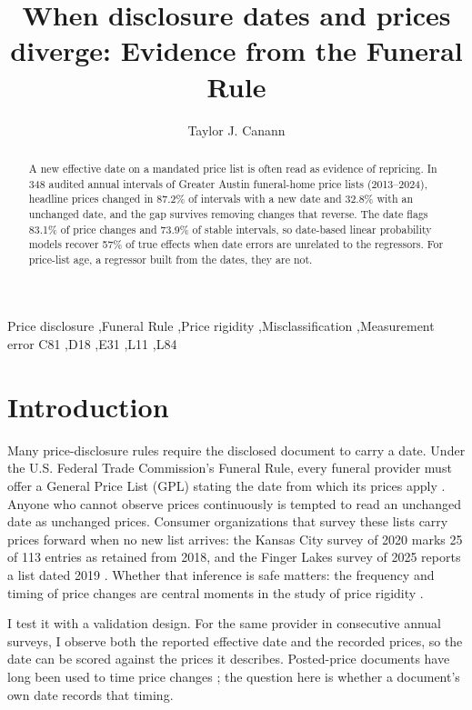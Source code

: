 \documentclass[preprint,12pt,authoryear]{elsarticle}
\makeatletter
\newcommand{\authoremail}{tcanann@latech.edu}
\makeatother
\begin{document}
\begin{frontmatter}
\title{When disclosure dates and prices diverge: Evidence from the Funeral Rule}
\author{Taylor J. Canann}
\ead{\authoremail}

\begin{abstract}
A new effective date on a mandated price list is often read as evidence of repricing. In 348 audited annual intervals of Greater Austin funeral-home price lists (2013--2024), headline prices changed in 87.2\% of intervals with a new date and 32.8\% with an unchanged date, and the gap survives removing changes that reverse. The date flags 83.1\% of price changes and 73.9\% of stable intervals, so date-based linear probability models recover 57\% of true effects when date errors are unrelated to the regressors. For price-list age, a regressor built from the dates, they are not.
\end{abstract}

\begin{keyword}
Price disclosure \sep Funeral Rule \sep Price rigidity \sep Misclassification \sep Measurement error
\JEL C81 \sep D18 \sep E31 \sep L11 \sep L84
\end{keyword}
\end{frontmatter}

\section{Introduction}
Many price-disclosure rules require the disclosed document to carry a date. Under the U.S. Federal Trade Commission's Funeral Rule, every funeral provider must offer a General Price List (GPL) stating the date from which its prices apply \citep{ftc_funeral_rule_guide}. Anyone who cannot observe prices continuously is tempted to read an unchanged date as unchanged prices. Consumer organizations that survey these lists carry prices forward when no new list arrives: the Kansas City survey of 2020 marks 25 of 113 entries as retained from 2018, and the Finger Lakes survey of 2025 reports a list dated 2019 \citep{fcagkc2020,fcafl2025}. Whether that inference is safe matters: the frequency and timing of price changes are central moments in the study of price rigidity \citep{bils_klenow_2004,nakamura_steinsson_2008}.

I test it with a validation design. For the same provider in consecutive annual surveys, I observe both the reported effective date and the recorded prices, so the date can be scored against the prices it describes. Posted-price documents have long been used to time price changes \citep{kashyap_1995,fisher_konieczny_2000}; the question here is whether a document's own date records that timing.
\end{document}

